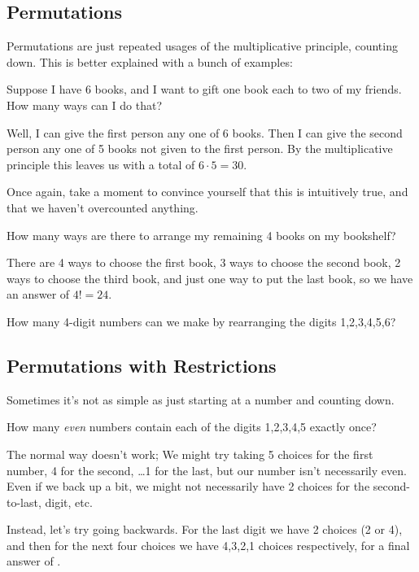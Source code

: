 \documentclass{scrartcl}
\begin{document}
	\subsection{Permutations}
	Permutations are just repeated usages of the multiplicative principle, counting down. This is better explained with a bunch of examples:
	\begin{example}
		Suppose I have 6 books, and I want to gift one book each to two of my friends.  How many ways can I do that?
	\end{example}
	\begin{soln}
		Well, I can give the first person any one of 6 books. Then I can give the second person any one of 5 books not given to the first person. By the multiplicative principle this leaves us with a total of $6 \cdot 5 = \boxed{30}$.
	\end{soln}
	\begin{exercise}
		Once again, take a moment to convince yourself that this is intuitively true, and that we haven't overcounted anything.
	\end{exercise}
	\begin{example}
		How many ways are there to arrange my remaining 4 books on my bookshelf?
	\end{example}
	\begin{soln}
	There are 4 ways to choose the first book, 3 ways to choose the second book, 2 ways to choose the third book, and just one way to put the last book, so we have an answer of $4! = \boxed{24}$.
	\end{soln}
	\begin{exercise}
		How many 4-digit numbers can we make by rearranging the digits 1,2,3,4,5,6?
	\end{exercise}
	\subsection{Permutations with Restrictions}
	Sometimes it's not as simple as just starting at a number and counting down.

	\begin{example}
		How many \emph{even} numbers contain each of the digits 1,2,3,4,5 exactly once?
	\end{example}
	\begin{soln}
		The normal way doesn't work; We might try taking 5 choices for the first number, 4 for the second, \dots 1 for the last, but our number isn't necessarily even. Even if we back up a bit, we might not necessarily have 2 choices for the second-to-last, digit, etc.

		Instead, let's try going backwards. For the last digit we have 2 choices (2 or 4), and then for the next four choices we have 4,3,2,1 choices respectively, for a final answer of .
	\end{soln}
\end{document}
